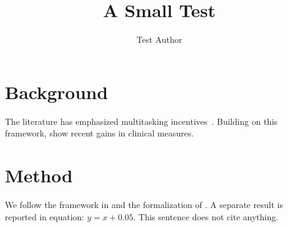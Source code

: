 \documentclass{article}
\title{A Small Test}
\author{Test Author}
\begin{document}
\maketitle

\section{Background}

The literature has emphasized multitasking incentives~\citep{holmstrom1991multitask, kane2008estimating}. Building on this framework, \citet{anderson2026starrating} show recent gains in clinical measures.

\section{Method}

We follow the framework in \citet{ellis1986provider} and the formalization of \citep{dixit2002incentives}. A separate result is reported in equation: $y = x + 0.05$. This sentence does not cite anything.
\end{document}

